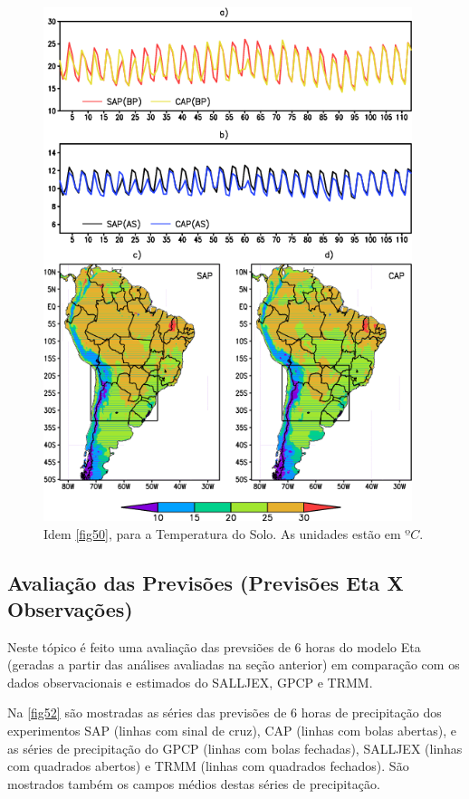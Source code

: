 \begin{figure}[!hbp]
\centering
\includegraphics[height=15cm]{./figs/serie_temperatura_solo-ANL-new.png}
\caption{Idem \autoref{fig50}, para a Temperatura do Solo. As unidades estão em $ºC$.}
\label{fig51}
\end{figure}

\break

\subsection{Avaliação das Previsões (Previsões Eta X Observações)}
\label{ss:avalprev}

Neste tópico é feito uma avaliação das prevsiões de 6 horas do modelo Eta (geradas a partir das análises avaliadas na seção anterior) em comparação com os dados observacionais e estimados do SALLJEX, GPCP e TRMM.

Na \autoref{fig52} são mostradas as séries das previsões de 6 horas de precipitação dos experimentos SAP (linhas com sinal de cruz), CAP (linhas com bolas abertas),  e as séries de precipitação do GPCP (linhas com bolas fechadas),  SALLJEX (linhas com quadrados abertos) e TRMM (linhas com quadrados fechados). São mostrados também os campos médios destas séries de precipitação.

